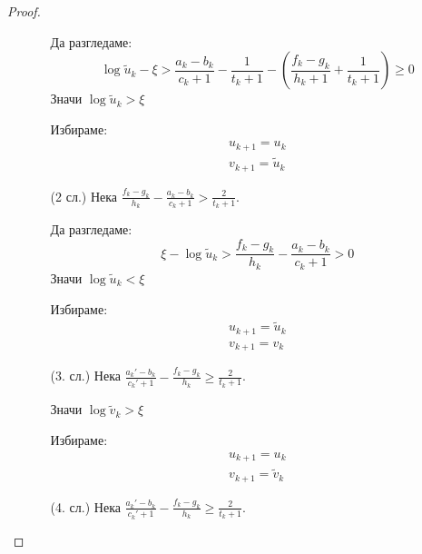 \begin{proof}
\begin{itemize}
\begin{itemize}
            Да разгледаме:
            \begin{equation}
                \log \tilde u_k - \xi > \frac{a_k - b_k}{c_k+1} - \frac{1}{t_k+1} - \left(\frac{f_k-g_k}{h_k + 1} + \frac{1}{t_k +1}\right) \geq 0
            \end{equation}
            Значи $\log \tilde u_k > \xi$

            Избираме:
            \begin{equation}
                \begin{split}
                    u_{k+1} = u_k \\
                    v_{k+1} = \tilde u_k
                \end{split}
            \end{equation}

            \item[(2 сл.)] Нека $\frac{f_k - g_k}{h_k} - \frac{a_k - b_k}{c_k + 1} > \frac{2}{t_k+1}$.
            
            Да разгледаме:
            \begin{equation}
                \xi - \log \tilde u_k > \frac{f_k - g_k}{h_k} - \frac{a_k - b_k}{c_k + 1} > 0
            \end{equation}
            Значи $\log \tilde u_k < \xi$

            Избираме:
            \begin{equation}
                \begin{split}
                    u_{k+1} = \tilde u_k \\
                    v_{k+1} = v_k
                \end{split}
            \end{equation}
        \item[(3. сл.)] Нека $\frac{a_k' - b_k}{c_k' + 1} - \frac{f_k - g_k}{h_k} \geq \frac{2}{t_k+1}$.
            
            Значи $\log \tilde v_k > \xi$

            Избираме:
            \begin{equation}
                \begin{split}
                    u_{k+1} = u_k \\
                    v_{k+1} = \tilde v_k
                \end{split}
            \end{equation}
        \item[(4. сл.)] Нека $\frac{a_k' - b_k}{c_k' + 1} - \frac{f_k - g_k}{h_k} \geq \frac{2}{t_k+1}$.
            

\end{itemize}
\end{itemize}
\end{proof}
